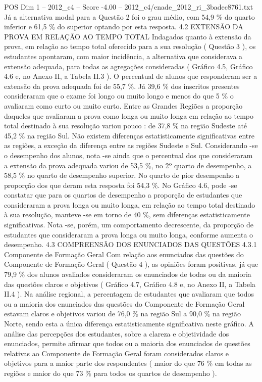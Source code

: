 \begin{textsample}{POS Dim 1 – 2012\_c4 – Score -4.00 – 2012\_c4/enade\_2012\_ri\_3badec8761.txt}
Já a alternativa modal para a Questão 2 foi o grau médio, com 54,9 \% do quarto inferior e 61,5 \% do superior optando por esta resposta. 4.2 EXTENSÃO DA PROVA EM RELAÇÃO AO TEMPO TOTAL Indagados quanto à extensão da prova, em relação ao tempo total oferecido para a sua resolução ( Questão 3 ), os estudantes apontaram, com maior incidência, a alternativa que considerava a extensão adequada, para todas as agregações consideradas ( Gráfico 4.5, Gráfico 4.6 e, no Anexo II, a Tabela II.3 ).
O percentual de alunos que responderam ser a extensão da prova adequada foi de 55,7 \%.
Já 39,6 \% dos inscritos presentes consideraram que o exame foi longo ou muito longo e menos do que 5 \% o avaliaram como curto ou muito curto.
Entre as Grandes Regiões a proporção daqueles que avaliaram a prova como longa ou muito longa em relação ao tempo total destinado à sua resolução variou pouco : de 37,8 \% na região Sudeste até 45,2 \% na região Sul.
Não existem diferenças estatisticamente significativas entre as regiões, a exceção da diferença entre as regiões Sudeste e Sul.
Considerando -se o desempenho dos alunos, nota -se ainda que o percentual dos que consideraram a extensão da prova adequada variou de 53,5 \%, no 2º quarto de desempenho, a 58,5 \% no quarto de desempenho superior.
No quarto de pior desempenho a proporção dos que deram esta resposta foi 54,3 \%.
No Gráfico 4.6, pode -se constatar que para os quartos de desempenho a proporção de estudantes que consideraram a prova longa ou muito longa, em relação ao tempo total destinado à sua resolução, manteve -se em torno de 40 \%, sem diferenças estatisticamente significativas.
Nota -se, porém, um comportamento decrescente, da proporção de estudantes que consideraram a prova longa ou muito longa, conforme aumenta o desempenho. 4.3 COMPREENSÃO DOS ENUNCIADOS DAS QUESTÕES 4.3.1 Componente de Formação Geral Com relação aos enunciados das questões do Componente de Formação Geral ( Questão 4 ), as opiniões foram positivas, já que 79,9 \% dos alunos avaliados consideraram os enunciados de todas ou da maioria das questões claros e objetivos ( Gráfico 4.7, Gráfico 4.8 e, no Anexo II, a Tabela II.4 ).
Na análise regional, a percentagem de estudantes que avaliaram que todos ou a maioria dos enunciados das questões do Componente de Formação Geral estavam claros e objetivos variou de 76,0 \% na região Sul a 90,0 \% na região Norte, sendo esta a única diferença estatisticamente significativa neste gráfico.
A análise das percepções dos estudantes, sobre a clareza e objetividade dos enunciados, permite afirmar que todos ou a maioria dos enunciados de questões relativas ao Componente de Formação Geral foram considerados claros e objetivos para a maior parte dos respondentes ( maior do que 76 \% em todas as regiões e maior do que 73 \% para todos os quartos de desempenho ).

\end{textsample}
